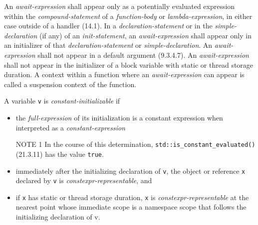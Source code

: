 \begin{modification}
An \emph{await-expression} shall appear only as a potentially evaluated
expression within the \emph{compound-statement} of
a \emph{function-body} or \emph{lambda-expression}, in either case outside of a
handler (14.1). In a \emph{declaration-statement} or in
the \emph{simple-declaration} (if any) of an \emph{init-statement}, an
\emph{await-expression} shall appear only in an initializer of that
\emph{declaration-statement} or \emph{simple-declaration}. An
\emph{await-expression} shall not appear in a default argument (9.3.4.7).
An \emph{await-expression} shall not appear in the initializer of a block variable with static or thread storage
duration.  A context within a function where an \emph{await-expression} can appear is called a suspension
context of the function.
\end{modification}

\begin{modification}
A variable \texttt{v} is \emph{constant-initializable} if

\begin{itemize}[label=\textemdash]
\item
the \emph{full-expression} of its initialization is a constant expression when
interpreted as a \emph{constant-expression}
\newline

NOTE 1 In the course of this determination,
\texttt{std::is\_constant\_evaluated()} (21.3.11) has the value \texttt{true}.
\newline


\item
immediately after the initializing declaration of \texttt{v}, the object or
reference \texttt{x} declared by \texttt{v} is \emph{constexpr-representable}, and

\item
if \texttt{x} has static or thread storage duration, \texttt{x} is
\emph{constexpr-representable} at the nearest point whose
immediate scope is a namespace scope that follows the initializing declaration of v.

\end{itemize}

\end{modification}

